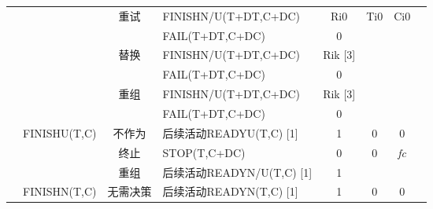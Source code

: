 \begin{table}[htbp]
\begin{tabular}{rrrrrrrr}
        \multicolumn{1}{c}{} &       & \multicolumn{1}{c}{\multirow{2}[4]{*}{重试}} & \multicolumn{1}{l}{FINISHN/U(T+DT,C+DC)} & \multicolumn{1}{c}{Ri0} & \multicolumn{1}{c}{\multirow{2}[4]{*}{Ti0}} & \multicolumn{1}{c}{\multirow{2}[4]{*}{Ci0}} \\
        \multicolumn{1}{c}{} &       & \multicolumn{1}{c}{} & \multicolumn{1}{l}{FAIL(T+DT,C+DC)} & \multicolumn{1}{c}{0} & \multicolumn{1}{c}{} & \multicolumn{1}{c}{} \\
        \multicolumn{1}{c}{} &       & \multicolumn{1}{c}{\multirow{2}[4]{*}{替换}} & \multicolumn{1}{l}{FINISHN/U(T+DT,C+DC)} & \multicolumn{1}{c}{Rik  [3]} & \multicolumn{1}{c}{\multirow{2}[4]{*}{\textit{}}} & \multicolumn{1}{c}{\multirow{2}[4]{*}{\textit{}}} \\
        \multicolumn{1}{c}{} &       & \multicolumn{1}{c}{} & \multicolumn{1}{l}{FAIL(T+DT,C+DC)} & \multicolumn{1}{c}{0} & \multicolumn{1}{c}{} & \multicolumn{1}{c}{} \\
        \multicolumn{1}{c}{} &       & \multicolumn{1}{c}{\multirow{2}[4]{*}{重组}} & \multicolumn{1}{l}{FINISHN/U(T+DT,C+DC)} & \multicolumn{1}{c}{Rik  [3]} & \multirow{2}[4]{*}{\textit{}} & \multirow{2}[4]{*}{\textit{}} \\
        \multicolumn{1}{c}{} &       & \multicolumn{1}{c}{} & \multicolumn{1}{l}{FAIL(T+DT,C+DC)} & \multicolumn{1}{c}{0} &       &  \\
        \multicolumn{1}{c}{} & \multirow{3}[6]{*}{FINISHU(T,C)} & \multicolumn{1}{c}{不作为} & \multicolumn{1}{l}{后续活动READYU(T,C) [1]} & \multicolumn{1}{c}{1} & \multicolumn{1}{c}{0} & \multicolumn{1}{c}{0} \\
        \multicolumn{1}{c}{} &       & \multicolumn{1}{c}{终止} & \multicolumn{1}{l}{STOP(T,C+DC)} & \multicolumn{1}{c}{0} & \multicolumn{1}{c}{0} & \multicolumn{1}{c}{\textit{fc}} \\
        \multicolumn{1}{c}{} &       & \multicolumn{1}{c}{重组} & \multicolumn{1}{l}{后续活动READYN/U(T,C) [1]} & \multicolumn{1}{c}{1} &       & \textit{} \\
        \multicolumn{1}{c}{} & FINISHN(T,C) & \multicolumn{1}{c}{无需决策} & \multicolumn{1}{l}{后续活动READYN(T,C) [1]} & \multicolumn{1}{c}{1} & \multicolumn{1}{c}{0} & \multicolumn{1}{c}{0} \\
            \bottomrule
        \end{tabular}%
        \label{tab:addlabel}%
    \end{table}%
    


